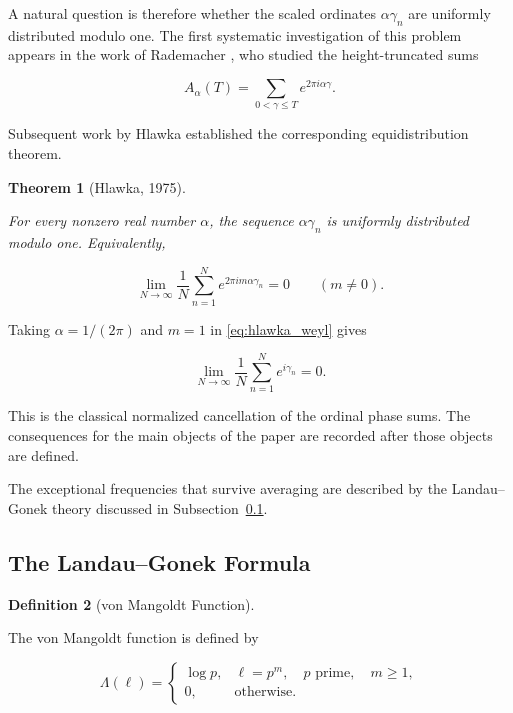 \documentclass[11pt]{amsart}
\numberwithin{equation}{section}
\theoremstyle{plain}
\newtheorem{theorem}{Theorem}[section]
\theoremstyle{definition}
\newtheorem{definition}[theorem]{Definition}
\theoremstyle{remark}
\begin{document}
A natural question is therefore whether the scaled ordinates
\(\alpha\gamma_n\) are uniformly distributed modulo one. The first
systematic investigation of this problem appears in the work of
Rademacher \cite{Rademacher1956}, who studied the height-truncated sums

\begin{equation}
A_\alpha(T)
=
\sum_{0<\gamma\le T}
e^{2\pi i \alpha \gamma}.
\label{eq:rademacher_sum}
\end{equation}

Subsequent work by Hlawka established the corresponding
equidistribution theorem.

\begin{theorem}[Hlawka, 1975]
\label{thm:hlawka}

For every nonzero real number \(\alpha\), the sequence
\(\alpha\gamma_n\) is uniformly distributed modulo one. Equivalently,

\begin{equation}
\lim_{N\to\infty}
\frac{1}{N}
\sum_{n=1}^{N}
e^{2\pi i m \alpha \gamma_n}
=
0
\qquad
(m\neq 0).
\label{eq:hlawka_weyl}
\end{equation}

\end{theorem}

Taking \(\alpha=1/(2\pi)\) and \(m=1\) in
\eqref{eq:hlawka_weyl} gives

\begin{equation}
\lim_{N\to\infty}
\frac{1}{N}
\sum_{n=1}^{N}
e^{i\gamma_n}
=
0.
\label{eq:SN_normalized_cancellation}
\end{equation}

This is the classical normalized cancellation of the ordinal phase sums.
The consequences for the main objects of the paper are recorded after
those objects are defined.

The exceptional frequencies that survive averaging are described by the
Landau--Gonek theory discussed in Subsection~\ref{sec:prime_power_frequencies}.

\subsection{The Landau--Gonek Formula}
\label{sec:prime_power_frequencies}

\begin{definition}[von Mangoldt Function]
\label{def:von_mangoldt_function}

The von Mangoldt function is defined by

\begin{equation}
\Lambda(\ell)
=
\begin{cases}
\log p,
&
\ell=p^{m},
\quad p \text{ prime},
\quad m\ge 1,
\\[1ex]
0,
&
\text{otherwise}.
\end{cases}
\label{eq:von_mangoldt}
\end{equation}

\end{definition}
\end{document}
